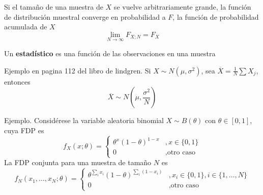 \begin{proposicion}
Si el tamaño de una muestra de $X$ se vuelve arbitrariamente grande, la función de distribución muestral converge en probabilidad a $F$, la función de probabilidad acumulada de $X$
\begin{equation}
\lim_{N \rightarrow \infty} F_{X; N} = F_X
\end{equation}
\end{proposicion}


\begin{definicion}
Un \textbf{estadístico} es una función de las observaciones en una muestra
\end{definicion}

Ejemplo en pagina 112 del libro de lindgren.
Si $X\sim N(\mu,\sigma^{2})$, sea $\overline{X} = \frac{1}{N} \sum X_j$, entonces
\begin{equation}
\overline{X} \sim N(\mu,\frac{\sigma^{2}}{N})
\end{equation}

Ejemplo.
Considérese la variable aleatoria binomial $X \sim B(\theta)$ con $\theta \in [0, 1]$, cuya FDP es
\begin{equation}
f_X(x; \theta) = \begin{cases}
\theta^{x} (1-\theta)^{1-x} &, x\in \{ 0,1 \} \\
0 &, \text{otro caso}
\end{cases}
\end{equation}
La FDP conjunta para una muestra de tamaño $N$ es
\begin{equation}
f_N(x_1, \dots, x_N; \theta) = 
\begin{cases}
\theta^{\sum_i x_i}(1-\theta)^{\sum_i(1-x_i)} &, x_i \in \{ 0,1 \}, i\in \{1, \dots, N\} \\
0 &, \text{otro caso}
\end{cases}
\end{equation}

